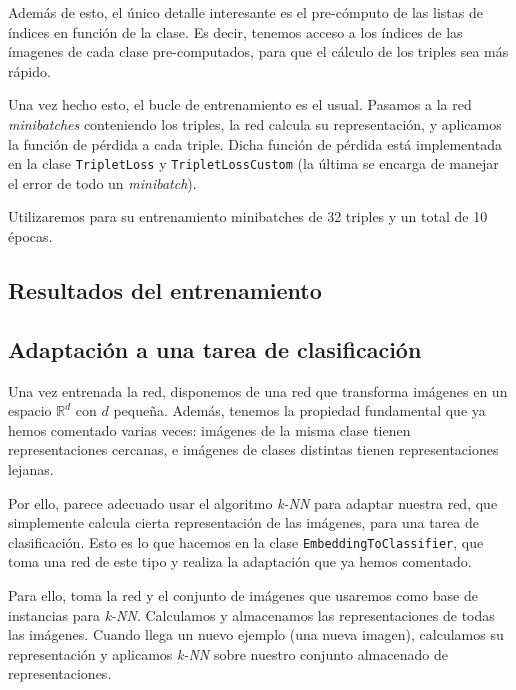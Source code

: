 \documentclass[11pt]{article}
\begin{document}
Además de esto, el único detalle interesante es el pre-cómputo de las listas de índices en función de la clase. Es decir, tenemos acceso a los índices de las ímagenes de cada clase pre-computados, para que el cálculo de los triples sea más rápido.

Una vez hecho esto, el bucle de entrenamiento es el usual. Pasamos a la red \emph{minibatches} conteniendo los triples, la red calcula su representación, y aplicamos la función de pérdida a cada triple. Dicha función de pérdida está implementada en la clase \lstinline{TripletLoss} y \lstinline{TripletLossCustom} (la última se encarga de manejar el error de todo un \emph{minibatch}).

Utilizaremos para su entrenamiento minibatches de 32 triples y un total de 10 épocas.

\subsection{Resultados del entrenamiento}


\subsection{Adaptación a una tarea de clasificación} 

Una vez entrenada la red, disponemos de una red que transforma imágenes en un espacio $\mathbb{R}^d$ con $d$ pequeña. Además, tenemos la propiedad fundamental que ya hemos comentado varias veces: imágenes de la misma clase tienen representaciones cercanas, e imágenes de clases distintas tienen representaciones lejanas.

Por ello, parece adecuado usar el algoritmo \emph{k-NN} para adaptar nuestra red, que simplemente calcula cierta representación de las imágenes, para una tarea de clasificación. Esto es lo que hacemos en la clase \lstinline{EmbeddingToClassifier}, que toma una red de este tipo y realiza la adaptación que ya hemos comentado.

Para ello, toma la red y el conjunto de imágenes que usaremos como base de instancias para \emph{k-NN}. Calculamos y almacenamos las representaciones de todas las imágenes. Cuando llega un nuevo ejemplo (una nueva imagen), calculamos su representación y aplicamos \emph{k-NN} sobre nuestro conjunto almacenado de representaciones. 
\end{document}
